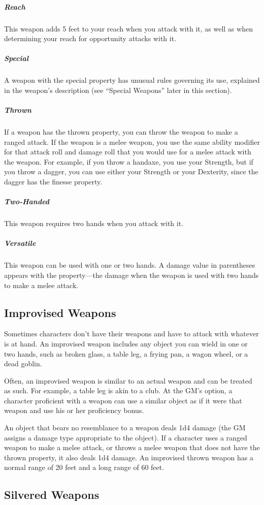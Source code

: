 \subparagraph*{Reach} This weapon adds 5 feet to your reach when you attack with it, as well as when determining your reach for opportunity attacks with it.

\subparagraph*{Special} A weapon with the special property has unusual rules governing its use, explained in the weapon's description (see “Special Weapons” later in this section).

\subparagraph*{Thrown} If a weapon has the thrown property, you can throw the weapon to make a ranged attack. If the weapon is a melee weapon, you use the same ability modifier for that attack roll and damage roll that you would use for a melee attack with the weapon. For example, if you throw a handaxe, you use your Strength, but if you throw a dagger, you can use either your Strength or your Dexterity, since the dagger has the finesse property.

\subparagraph*{Two-Handed} This weapon requires two hands when you attack with it.

\subparagraph*{Versatile} This weapon can be used with one or two hands. A damage value in parentheses appears with the property—the damage when the weapon is used with two hands to make a melee attack.

\subsection{Improvised Weapons}

Sometimes characters don't have their weapons and have to attack with whatever is at hand. An improvised weapon includes any object you can wield in one or two hands, such as broken glass, a table leg, a frying pan, a wagon wheel, or a dead goblin.

Often, an improvised weapon is similar to an actual weapon and can be treated as such. For example, a table leg is akin to a club. At the GM's option, a character proficient with a weapon can use a similar object as if it were that weapon and use his or her proficiency bonus.

An object that bears no resemblance to a weapon deals 1d4 damage (the GM assigns a damage type appropriate to the object). If a character uses a ranged weapon to make a melee attack, or throws a melee weapon that does not have the thrown property, it also deals 1d4 damage. An improvised thrown weapon has a normal range of 20 feet and a long range of 60 feet.

\subsection{Silvered Weapons}

